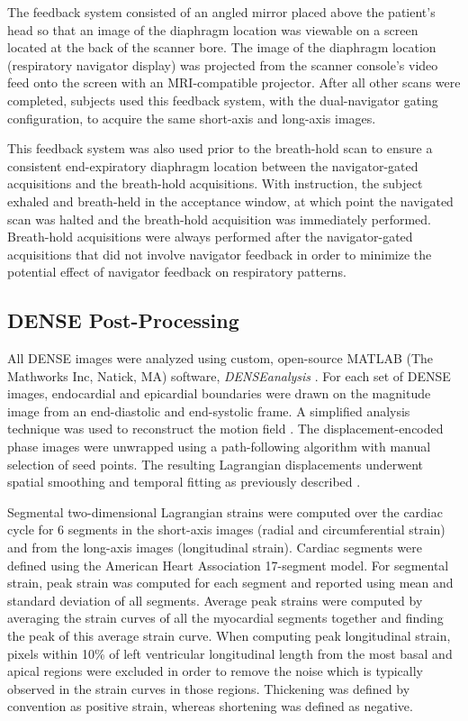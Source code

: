 	The feedback system consisted of an angled mirror placed above the patient's head so that an image of the diaphragm location was viewable on a screen located at the back of the scanner bore. The image of the diaphragm location (respiratory navigator display) was projected from the scanner console's video feed onto the screen with an MRI-compatible projector. After all other scans were completed, subjects used this feedback system, with the dual-navigator gating configuration, to acquire the same short-axis and long-axis images.
	
	This feedback system was also used prior to the breath-hold scan to ensure a consistent end-expiratory diaphragm location between the navigator-gated acquisitions and the breath-hold acquisitions. With instruction, the subject exhaled and breath-held in the acceptance window, at which point the navigated scan was halted and the breath-hold acquisition was immediately performed. Breath-hold acquisitions were always performed after the navigator-gated acquisitions that did not involve navigator feedback in order to minimize the potential effect of navigator feedback on respiratory patterns.

\subsection{DENSE Post-Processing}
	All DENSE images were analyzed using custom, open-source MATLAB (The Mathworks Inc, Natick, MA) software, \textit{DENSEanalysis} \cite{Gilliam2016a}. For each set of DENSE images, endocardial and epicardial boundaries were drawn on the magnitude image from an end-diastolic and end-systolic frame. A simplified analysis technique was used to reconstruct the motion field \cite{Suever2014}. The displacement-encoded phase images were unwrapped using a path-following algorithm with manual selection of seed points. The resulting Lagrangian displacements underwent spatial smoothing and temporal fitting as previously described \cite{Spottiswoode2007}.
	
	Segmental two-dimensional Lagrangian strains were computed over the cardiac cycle for 6 segments in the short-axis images (radial and circumferential strain) and from the long-axis images (longitudinal strain). Cardiac segments were defined using the American Heart Association 17-segment model. For segmental strain, peak strain was computed for each segment and reported using mean and standard deviation of all segments. Average peak strains were computed by averaging the strain curves of all the myocardial segments together and finding the peak of this average strain curve. When computing peak longitudinal strain, pixels within 10\% of left ventricular longitudinal length from the most basal and apical regions were excluded in order to remove the noise which is typically observed in the strain curves in those regions. Thickening was defined by convention as positive strain, whereas shortening was defined as negative.

